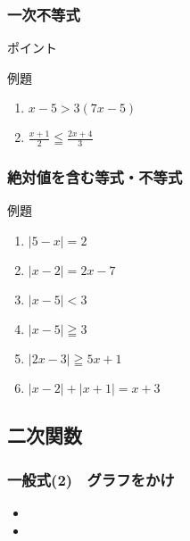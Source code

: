 \documentclass[10pt,dvipdfmx]{jsarticle}
\begin{document}
\subsubsection*{一次不等式}
\begin{itembox}[l]{ポイント}
  \vspace{8mm}

\end{itembox}
\begin{itembox}[l]{例題}
  \begin{large}
    \begin{enumerate}
      \item $x-5>3(7x-5)$
      \item $\frac{x+1}{2}\leqq\frac{2x+4}{3}$
    \end{enumerate}
  \end{large}
\end{itembox}

\subsubsection*{絶対値を含む等式・不等式}
\begin{itembox}[l]{例題}
  \begin{large}
    \begin{enumerate}
      \item $|5-x|=2$
      \item $|x-2|=2x-7$
      \item $|x-5|<3$
      \item $|x-5|\geqq3$
      \item $|2x-3|\geqq5x+1$
      \item $|x-2|+|x+1|=x+3$
    \end{enumerate}
  \end{large}
\end{itembox}

\newpage
\subsection*{二次関数}
\subsubsection*{一般式(2)　グラフをかけ}
\begin{large}
  \begin{itemize}
    \item
    \item
  \end{itemize}
\end{large}
\end{document}
